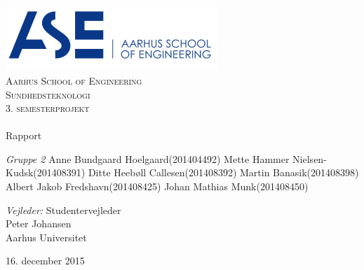 \begin{titlingpage}
\begin{center}

~ \\[3cm]

\includegraphics[width=0.6\textwidth]{figurer/ASE}~\\[1cm]

\textsc{\LARGE Aarhus School of Engineering}\\[1.5cm]

\textsc{\Large Sundhedsteknologi}\\
\textsc{\Large 3. semesterprojekt}\\[0.5cm]

\noindent\makebox[\linewidth]{\rule{\textwidth}{0.4pt}}\\
[0.5cm]{\Huge Rapport}
\noindent\makebox[\linewidth]{\rule{\textwidth}{0.4pt}}

\end{center}



\textit{Gruppe 2} \newline
Anne Bundgaard Hoelgaard\tab(201404492) \newline
Mette Hammer Nielsen-Kudsk\tab(201408391) \newline
Ditte Heebøll Callesen\tab(201408392) \newline	
Martin Banasik\tab(201408398) \newline	
Albert Jakob Fredshavn\tab(201408425) \newline 
Johan Mathias Munk\tab(201408450) \newline 




\textit{Vejleder:} \newline
Studentervejleder\\
Peter Johansen\\
Aarhus Universitet


\vfill

\begin{center}
{\large 16. december 2015}
\end{center}


\end{titlingpage}